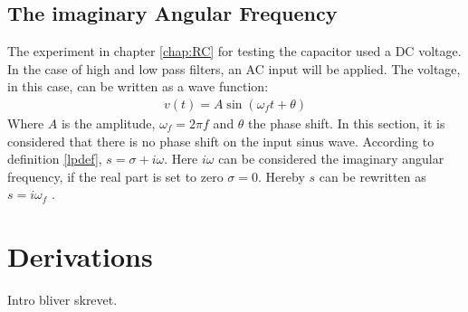 \subsection{The imaginary Angular Frequency}
The experiment in chapter \ref{chap:RC} for testing the capacitor used a DC voltage. In the case of high and low pass filters, an AC input will be applied. The voltage, in this case, can be written as a wave function:
\begin{align}
v(t)=A\sin(\omega_f t+\theta)
\end{align}
Where $A$ is the amplitude, $\omega_f=2\pi f$ and $\theta$ the phase shift. In this section, it is considered that there is no phase shift on the input sinus wave. According to definition \ref{lpdef}, $s=\sigma + i \omega$. Here $i \omega$ can be considered the imaginary angular frequency, if the real part is set to zero $\sigma = 0$. Hereby $s$ can be rewritten as $s = i \omega_f$ \cite[p. 733 - 735]{bcircuit9}.

\section{Derivations} \label{Derivations}
Intro bliver skrevet.
